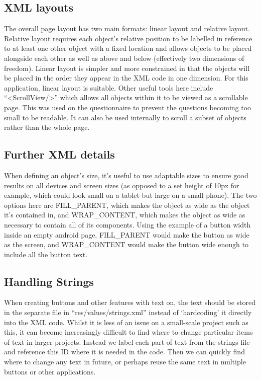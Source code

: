 \subsection{XML layouts}
The overall page layout has two main formats: linear layout and relative layout. Relative layout requires each object's relative position to be labelled in reference to at least one other object with a fixed location and allows objects to be placed alongside each other as well as above and below (effectively two dimensions of freedom)\cite[p.~126]{lee2011beg}. Linear layout is simpler and more constrained in that the objects will be placed in the order they appear in the XML code in one dimension. For this application, linear layout is suitable. Other useful tools here include ``\textless ScrollView/\textgreater'' which allows all objects within it to be viewed as a scrollable page. This was used on the questionnaire to prevent the questions becoming too small to be readable. It can also be used internally to scroll a subset of objects rather than the whole page.
\subsection{Further XML details}
When defining an object's size, it's useful to use adaptable sizes to ensure good results on all devices and screen sizes (as opposed to a set height of 10px for example, which could look small on a tablet but large on a small phone). The two options here are FILL\_PARENT, which makes the object as wide as the object it's contained in, and WRAP\_CONTENT, which makes the object as wide as necessary to contain all of its components. Using the example of a button width inside an empty android page, FILL\_PARENT would make the button as wide as the screen, and WRAP\_CONTENT would make the button wide enough to include all the button text.
\subsection{Handling Strings}
When creating buttons and other features with text on, the text should be stored in the separate file in ``res/values/strings.xml'' instead of ‘hardcoding' it directly into the XML code. Whilst it is less of an issue on a small-scale project such as this, it can become increasingly difficult to find where to change particular items of text in larger projects. Instead we label each part of text from the strings file and reference this ID where it is needed in the code. Then we can quickly find where to change any text in future, or perhaps reuse the same text in multiple buttons or other applications.
